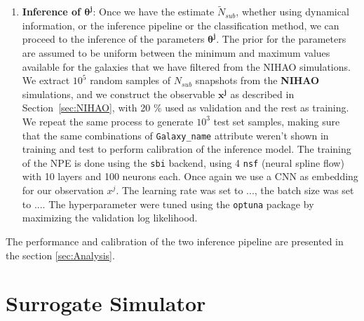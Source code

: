 \begin{enumerate}
    \item \textbf{Inference of $\mathbf{\theta^j}$}: Once we have the estimate $\tilde{N}_{sub}$, whether using dynamical information, or the inference pipeline or the classification method, we can proceed to the inference of the parameters $\mathbf{\theta^j}$. The prior for the parameters are assumed to be uniform between the minimum and maximum values available for the galaxies that we have filtered from the NIHAO simulations. We extract $10^5$ random samples of $N_{sub}$ snapshots from the \textbf{NIHAO} simulations, and we construct the observable \textbf{$\mathbf{x^j}$} as described in Section~\ref{sec:NIHAO}, with 20 \% used as validation and the rest as training. We repeat the same process to generate $10^3$ test set samples, making sure that the same combinations of \texttt{Galaxy\_name} attribute weren't shown in training and test to perform calibration of the inference model. The training of the NPE is done using the \texttt{sbi} backend, using 4 \texttt{nsf} (neural spline flow) with 10 layers and 100 neurons each. Once again we use a CNN as embedding for our observation $x^j$. The learning rate was set to ..., the batch size was set to .... The hyperparameter were tuned using the \texttt{optuna} package by maximizing the validation log likelihood.  
\end{enumerate}

The performance and calibration of the two inference pipeline are presented in the section \ref{sec:Analysis}.

\section{Surrogate Simulator}
